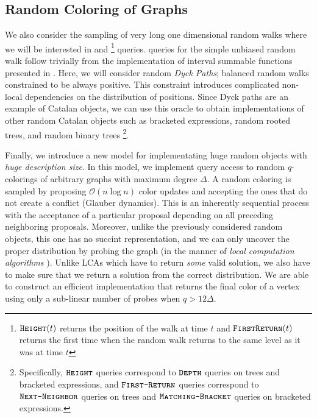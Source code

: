 \subsection{Random Coloring of Graphs}%
\label{sub:random_coloring_of_graphs}
We also consider the sampling of very long one dimensional random walks where we will be interested in  and 
\footnote{$\texttt{\textsc{Height}}(t)$ returns the position of the walk at time $t$
and $\texttt{\textsc{FirstReturn}}(t)$ returns the first time when the random walk returns to the same level as it was at time $t$} queries.
 queries for the simple unbiased random walk follow trivially from the implementation of interval summable functions presented in \cite{huge}.
Here, we will consider random \emph{Dyck Paths}; balanced random walks constrained to be always positive.
This constraint introduces complicated non-local dependencies on the distribution of positions.
Since Dyck paths are an example of Catalan objects, we can use this oracle to obtain implementations of other random Catalan objects
such as bracketed expressions, random rooted trees, and random binary trees
\footnote{Specifically, $\texttt{\textsc{Height}}$ queries correspond to $\texttt{\textsc{Depth}}$ queries on trees and bracketed expressions,
and $\texttt{\textsc{First-Return}}$ queries correspond to $\texttt{\textsc{Next-Neighbor}}$ queries on trees and $\texttt{\textsc{Matching-Bracket}}$ queries on bracketed expressions.
}.

Finally, we introduce a new model for implementating huge random objects with \emph{huge description size}.
In this model, we implement query access to random $q$-colorings of arbitrary graphs with maximum degree $\Delta$.
A random coloring is sampled by proposing $\mathcal O(n\log n)$ color updates and accepting the ones that do not create a conflict (Glauber dynamics).
This is an inherently sequential process with the acceptance of a particular proposal depending on all preceding neighboring proposals.
Moreover, unlike the previously considered random objects, this one has no succint representation,
and we can only uncover the proper distribution by probing the graph (in the manner of \emph{local computation algorithms} \cite{LCA}).
Unlike LCAs which have to return \emph{some} valid solution, we also have to make sure that we return a solution from the correct distribution.
We are able to construct an efficient implementation that returns the final color of a vertex using only a sub-linear number of probes when $q>12\Delta$.
